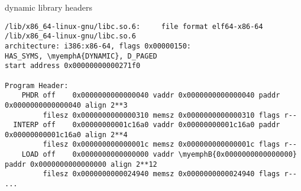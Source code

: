\providecommand{\myemphA}[1]{\myemph<1>{#1}}
\providecommand{\myemphB}[1]{\myemph<2>{#1}}
\begin{frame}[fragile,label=dl-libs]{dynamic library headers}
\begin{Verbatim}[commandchars=\\\{\},fontsize=\fontsize{9}{10}\selectfont]
/lib/x86_64-linux-gnu/libc.so.6:     file format elf64-x86-64
/lib/x86_64-linux-gnu/libc.so.6
architecture: i386:x86-64, flags 0x00000150:
HAS_SYMS, \myemphA{DYNAMIC}, D_PAGED
start address 0x00000000000271f0

Program Header:
    PHDR off    0x0000000000000040 vaddr 0x0000000000000040 paddr 0x0000000000000040 align 2**3
         filesz 0x0000000000000310 memsz 0x0000000000000310 flags r--
  INTERP off    0x00000000001c16a0 vaddr 0x00000000001c16a0 paddr 0x00000000001c16a0 align 2**4
         filesz 0x000000000000001c memsz 0x000000000000001c flags r--
    LOAD off    0x0000000000000000 vaddr \myemphB{0x0000000000000000} paddr 0x0000000000000000 align 2**12
         filesz 0x0000000000024940 memsz 0x0000000000024940 flags r--
...
\end{Verbatim}
\end{frame}

